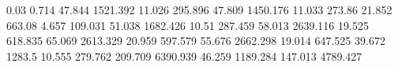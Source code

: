 0.03       0.714      %
47.844     1521.392   %
11.026     295.896    %
47.809     1450.176   %
11.033     273.86     %
21.852     663.08     %
4.657      109.031    %
51.038     1682.426   %
10.51      287.459    %
58.013     2639.116   %
19.525     618.835    %
65.069     2613.329   %
20.959     597.579    %
55.676     2662.298   %
19.014     647.525    %
39.672     1283.5     %
10.555     279.762    %
209.709    6390.939   %
46.259     1189.284   %
147.013    4789.427   %
